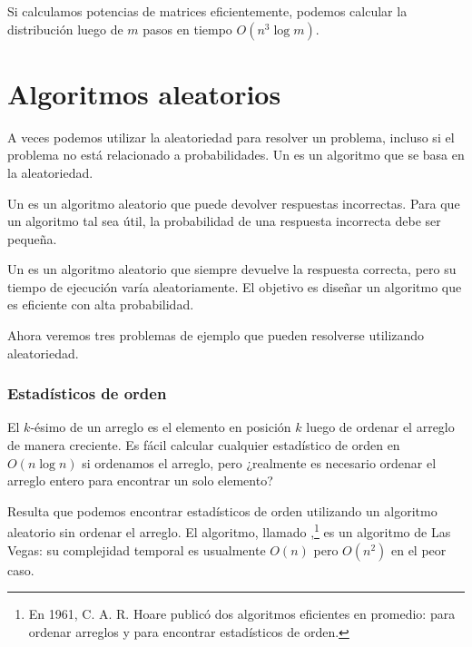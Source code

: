 Si calculamos potencias de matrices eficientemente, podemos calcular
la distribución luego de $m$ pasos en tiempo $O(n^3 \log m)$.

\section{Algoritmos aleatorios}


A veces podemos utilizar la aleatoriedad para resolver un problema,
incluso si el problema no está relacionado a probabilidades. Un
 es un algoritmo que se basa en la aleatoriedad.


Un  es un algoritmo aleatorio que puede
devolver respuestas incorrectas. Para que un algoritmo tal sea útil,
la probabilidad de una respuesta incorrecta debe ser pequeña.


Un  es un algoritmo aleatorio que siempre
devuelve la respuesta correcta, pero su tiempo de ejecución varía
aleatoriamente. El objetivo es diseñar un algoritmo que es eficiente
con alta probabilidad.

Ahora veremos tres problemas de ejemplo que pueden resolverse
utilizando aleatoriedad.

\subsubsection{Estadísticos de orden}


El $k$-ésimo  de un arreglo es el elemento
en posición $k$ luego de ordenar el arreglo de manera creciente. Es fácil
calcular cualquier estadístico de orden en $O(n \log n)$ si ordenamos
el arreglo, pero ¿realmente es necesario ordenar el arreglo entero
para encontrar un solo elemento?


Resulta que podemos encontrar estadísticos de orden utilizando un
algoritmo aleatorio sin ordenar el arreglo. El algoritmo, llamado
,\footnote{En 1961, C. A. R. Hoare publicó
    dos algoritmos eficientes en promedio:  \cite{hoa61a}
    para ordenar arreglos y  \cite{hoa61b} para encontrar
    estadísticos de orden.} es un algoritmo de Las Vegas: su complejidad
temporal es usualmente $O(n)$ pero $O(n^2)$ en el peor caso.

